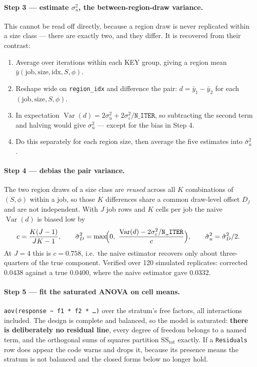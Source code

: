 \documentclass[11pt,a4paper]{article}
\begin{document}
\paragraph{Step 3 --- estimate $\sigma^2_u$, the between-region-draw variance.}
This cannot be read off directly, because a region draw is never replicated
within a size class --- there are exactly two, and they differ. It is recovered
from their contrast:

\begin{enumerate}
\item Average over iterations within each KEY group, giving a region mean
$\bar y(\text{job},\text{size},\text{idx},S,\phi)$.
\item Reshape wide on \texttt{region\_idx} and difference the pair:
$d = \bar y_1 - \bar y_2$ for each $(\text{job},\text{size},S,\phi)$.
\item In expectation
$\operatorname{Var}(d) = 2\sigma^2_u + 2\sigma^2_\varepsilon/\texttt{N\_ITER}$,
so subtracting the second term and halving would give $\sigma^2_u$ --- except
for the bias in Step 4.
\item Do this separately for each region size, then average the five estimates
into $\bar\sigma^2_u$.
\end{enumerate}

\paragraph{Step 4 --- debias the pair variance.}
The two region draws of a size class are \emph{reused} across all
$K$ combinations of $(S,\phi)$ within a job, so those $K$ differences share a
common draw-level offset $D_j$ and are not independent. With $J$ job rows and
$K$ cells per job the naive $\operatorname{Var}(d)$ is biased low by
\[
c=\frac{K(J-1)}{JK-1},
\qquad
\hat\sigma^2_D=\max\!\Bigl(0,\ \frac{\operatorname{Var}(d)-2\sigma^2_\varepsilon/\texttt{N\_ITER}}{c}\Bigr),
\qquad
\hat\sigma^2_u=\hat\sigma^2_D/2 .
\]
At $J=4$ this is $c=0.758$, i.e.\ the naive estimator recovers only about
three-quarters of the true component. Verified over 120 simulated replicates:
corrected $0.0438$ against a true $0.0400$, where the naive estimator gave
$0.0332$.

\paragraph{Step 5 --- fit the saturated ANOVA on cell means.}
\texttt{aov(response \textasciitilde{} f1 * f2 * \ldots)} over the stratum's free
factors, all interactions included. The design is complete and balanced, so the
model is saturated: \textbf{there is deliberately no residual line}, every degree
of freedom belongs to a named term, and the orthogonal sums of squares partition
$\mathrm{SS}_{\text{tot}}$ exactly. If a \texttt{Residuals} row does appear the
code warns and drops it, because its presence means the stratum is not balanced
and the closed forms below no longer hold.
\end{document}
